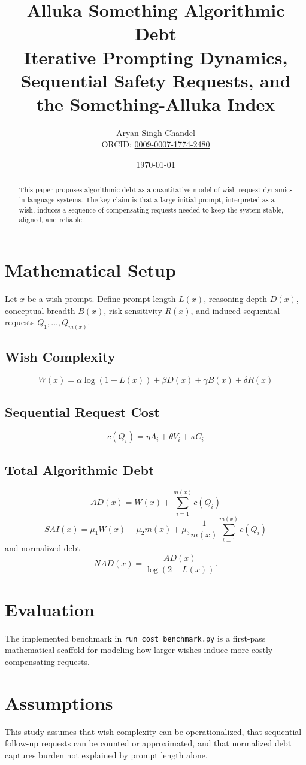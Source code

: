 \documentclass[11pt]{article}
\title{Alluka Something Algorithmic Debt\\\large Iterative Prompting Dynamics, Sequential Safety Requests, and the Something-Alluka Index}
\author{Aryan Singh Chandel\\\small ORCID: \href{https://orcid.org/0009-0007-1774-2480}{0009-0007-1774-2480}}
\date{\today}
\begin{document}
\maketitle

\begin{abstract}
This paper proposes algorithmic debt as a quantitative model of wish-request dynamics in language systems. The key claim is that a large initial prompt, interpreted as a wish, induces a sequence of compensating requests needed to keep the system stable, aligned, and reliable.
\end{abstract}

\section{Mathematical Setup}
Let $x$ be a wish prompt. Define prompt length $L(x)$, reasoning depth $D(x)$, conceptual breadth $B(x)$, risk sensitivity $R(x)$, and induced sequential requests $Q_1,\dots,Q_{m(x)}$.

\subsection{Wish Complexity}
\[
W(x)=\alpha \log(1+L(x))+\beta D(x)+\gamma B(x)+\delta R(x)
\]

\subsection{Sequential Request Cost}
\[
c(Q_i)=\eta A_i+\theta V_i+\kappa C_i
\]

\subsection{Total Algorithmic Debt}
\[
AD(x)=W(x)+\sum_{i=1}^{m(x)} c(Q_i)
\]
\[
SAI(x)=\mu_1 W(x)+\mu_2 m(x)+\mu_3 \frac{1}{m(x)}\sum_{i=1}^{m(x)} c(Q_i)
\]
and normalized debt
\[
NAD(x)=\frac{AD(x)}{\log(2+L(x))}.
\]

\section{Evaluation}
The implemented benchmark in \texttt{run\_cost\_benchmark.py} is a first-pass mathematical scaffold for modeling how larger wishes induce more costly compensating requests.

\section{Assumptions}
This study assumes that wish complexity can be operationalized, that sequential follow-up requests can be counted or approximated, and that normalized debt captures burden not explained by prompt length alone.
\end{document}
